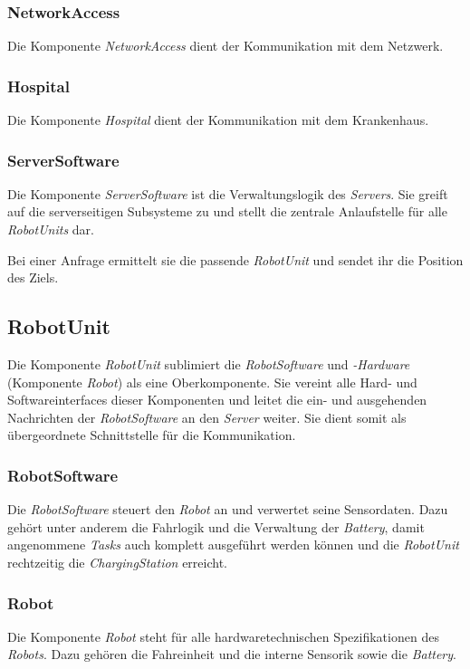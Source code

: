 \subsubsection{NetworkAccess}

Die Komponente \emph{NetworkAccess} dient der Kommunikation mit dem Netzwerk.

\subsubsection{Hospital}

Die Komponente \emph{Hospital} dient der Kommunikation mit dem Krankenhaus.

\subsubsection{ServerSoftware}

Die Komponente \emph{ServerSoftware} ist die Verwaltungslogik des \emph{Servers}. 
Sie greift auf die serverseitigen Subsysteme zu und stellt die zentrale Anlaufstelle f\"{u}r alle \emph{RobotUnits} dar.

Bei einer Anfrage ermittelt sie die passende \emph{RobotUnit} und sendet ihr die Position des Ziels.

\subsection{RobotUnit}

Die Komponente \emph{RobotUnit} sublimiert die \emph{RobotSoftware} und \emph{-Hardware} (Komponente \emph{Robot}) als eine Oberkomponente. 
Sie vereint alle Hard- und Softwareinterfaces dieser Komponenten und leitet die ein- und ausgehenden Nachrichten der \emph{RobotSoftware} an den \emph{Server} weiter. 
Sie dient somit als \"{u}bergeordnete Schnittstelle f\"{u}r die Kommunikation.

\subsubsection{RobotSoftware}

Die \emph{RobotSoftware} steuert den \emph{Robot} an und verwertet seine Sensordaten. 
Dazu geh\"{o}rt unter anderem die Fahrlogik und die Verwaltung der \emph{Battery}, damit angenommene \emph{Tasks} auch komplett ausgef\"{u}hrt werden k\"{o}nnen und die \emph{RobotUnit} rechtzeitig die \emph{ChargingStation} erreicht.

\subsubsection{Robot}

Die Komponente \emph{Robot} steht f\"{u}r alle hardwaretechnischen Spezifikationen des \emph{Robots}. 
Dazu geh\"{o}ren die Fahreinheit und die interne Sensorik sowie die \emph{Battery}.
